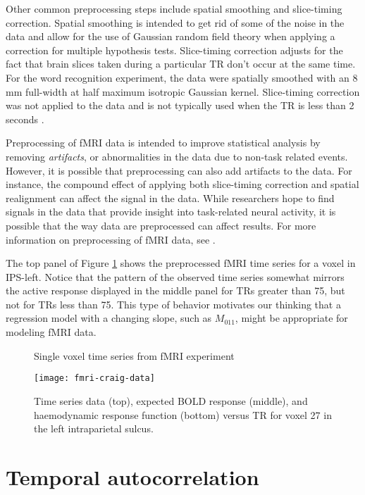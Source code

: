 Other common preprocessing steps include spatial smoothing and slice-timing correction. Spatial smoothing is intended to get rid of some of the noise in the data and allow for the use of Gaussian random field theory when applying a correction for multiple hypothesis tests. Slice-timing correction adjusts for the fact that brain slices taken during a particular TR don't occur at the same time. For the word recognition experiment, the data were spatially smoothed with an 8 mm full-width at half maximum isotropic Gaussian kernel. Slice-timing correction was not applied to the data and is not typically used when the TR is less than 2 seconds \citep{penny:spm:2011}.

Preprocessing of fMRI data is intended to improve statistical analysis by removing \emph{artifacts}, or abnormalities in the data due to non-task related events. However, it is possible that preprocessing can also add artifacts to the data. For instance, the compound effect of applying both slice-timing correction and spatial realignment can affect the signal in the data. While researchers hope to find signals in the data that provide insight into task-related neural activity, it is possible that the way data are preprocessed can affect results. For more information on preprocessing of fMRI data, see \citet[Chapter 4,][]{ashby:fmri:2011}.

The top panel of Figure \ref{fig:fmri:data} shows the preprocessed fMRI time series for a voxel in IPS-left. Notice that the pattern of the observed time series somewhat mirrors the active response displayed in the middle panel for TRs greater than 75, but not for TRs less than 75. This type of behavior motivates our thinking that a regression model with a changing slope, such as $M_{011}$, might be appropriate for modeling fMRI data.

\begin{figure}
\ssp
\centering
\caption{Single voxel time series from fMRI experiment} \label{fig:fmri:data}
\texttt{[image: fmri-craig-data]}
\caption*{Time series data (top), expected BOLD response (middle), and haemodynamic response function (bottom) versus TR for voxel 27 in the left intraparietal sulcus.}
\end{figure}

\section{Temporal autocorrelation \label{sec:fmri:cor}}

